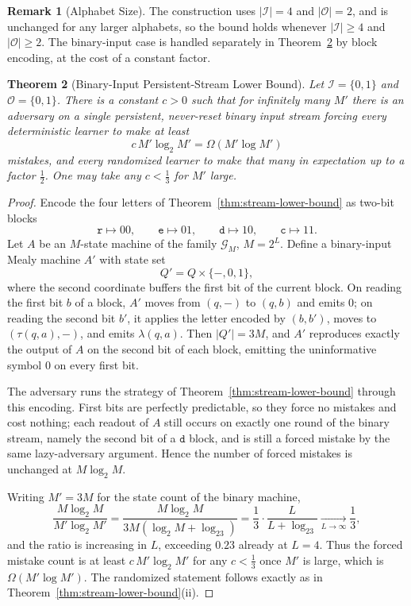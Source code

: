 \documentclass[12pt]{article}
\newtheorem{theorem}{Theorem}[section]
\theoremstyle{definition}
\newtheorem{remark}[theorem]{Remark}
\begin{document}
\begin{remark}[Alphabet Size]
\label{rem:stream-lb-alphabet}
The construction uses $|\mathcal I|=4$ and $|\mathcal O|=2$, and is unchanged
for any larger alphabets, so the bound holds whenever $|\mathcal I|\ge4$ and
$|\mathcal O|\ge2$.  The binary-input case is handled separately in
Theorem~\ref{thm:stream-lb-binary} by block encoding, at the cost of a
constant factor.
\end{remark}

\begin{theorem}[Binary-Input Persistent-Stream Lower Bound]
\label{thm:stream-lb-binary}
Let $\mathcal I=\{0,1\}$ and $\mathcal O=\{0,1\}$.  There is a constant
$c>0$ such that for infinitely many $M'$ there is an adversary on a single
persistent, never-reset binary input stream forcing every deterministic
learner to make at least
\[
c\,M'\log_2M'
=
\Omega(M'\log M')
\]
mistakes, and every randomized learner to make that many in expectation up to
a factor $\tfrac12$.  One may take any $c<\tfrac13$ for $M'$ large.
\end{theorem}

\begin{proof}
Encode the four letters of Theorem~\ref{thm:stream-lower-bound} as two-bit
blocks
\[
\mathtt r\mapsto00,\qquad
\mathtt e\mapsto01,\qquad
\mathtt d\mapsto10,\qquad
\mathtt c\mapsto11 .
\]
Let $A$ be an $M$-state machine of the family $\mathcal G_M$, $M=2^L$.  Define
a binary-input Mealy machine $A'$ with state set
\[
Q'=Q\times\{-,0,1\},
\]
where the second coordinate buffers the first bit of the current block.  On
reading the first bit $b$ of a block, $A'$ moves from $(q,-)$ to $(q,b)$ and
emits $0$; on reading the second bit $b'$, it applies the letter encoded by
$(b,b')$, moves to $(\tau(q,a),-)$, and emits $\lambda(q,a)$.  Then
$|Q'|=3M$, and $A'$ reproduces exactly the output of $A$ on the second bit of
each block, emitting the uninformative symbol $0$ on every first bit.

The adversary runs the strategy of Theorem~\ref{thm:stream-lower-bound}
through this encoding.  First bits are perfectly predictable, so they force no
mistakes and cost nothing; each readout of $A$ still occurs on exactly one
round of the binary stream, namely the second bit of a $\mathtt d$ block, and
is still a forced mistake by the same lazy-adversary argument.  Hence the
number of forced mistakes is unchanged at $M\log_2M$.

Writing $M'=3M$ for the state count of the binary machine,
\[
\frac{M\log_2M}{M'\log_2M'}
=
\frac{M\log_2M}{3M(\log_2M+\log_23)}
=
\frac13\cdot\frac{L}{L+\log_23}
\xrightarrow[L\to\infty]{}
\frac13 ,
\]
and the ratio is increasing in $L$, exceeding $0.23$ already at $L=4$.  Thus
the forced mistake count is at least $c\,M'\log_2M'$ for any $c<\tfrac13$ once
$M'$ is large, which is $\Omega(M'\log M')$.  The randomized statement follows
exactly as in Theorem~\ref{thm:stream-lower-bound}(ii).
\end{proof}
\end{document}
